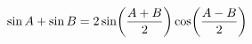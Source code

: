 \documentclass[preview]{standalone}
\begin{document}
\begin{align*}
\special{dvisvgm:raw <g id='unique000'>}\sin A + \sin B = 2\sin\!\left(\frac{A+B}{2}\right)\cos\!\left(\frac{A-B}{2}\right)\special{dvisvgm:raw </g>}
\end{align*}
\end{document}
